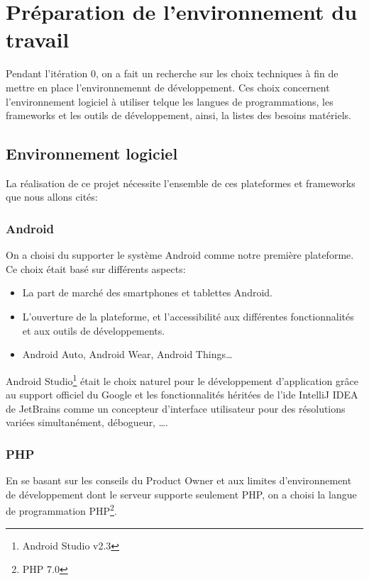 \section{Préparation de l'environnement du travail}

Pendant l'itération 0, on a fait un recherche sur les choix techniques à fin de
mettre en place l'environnemennt de développement. Ces choix concernent
l'environnement logiciel à utiliser telque les langues de programmations, les
frameworks et les outils de développement, ainsi, la listes des besoins
matériels.

\subsection{Environnement logiciel}

La réalisation de ce projet nécessite l'ensemble de ces plateformes et
frameworks que nous allons cités:

\subsubsection{Android}

On a choisi du supporter le système Android comme notre première plateforme. Ce
choix était basé sur différents aspects:

\begin{itemize}
    \item La part de marché des smartphones et tablettes Android.
    \item L'ouverture de la plateforme, et l'accessibilité aux différentes
        fonctionnalités et aux outils de développements.
    \item Android Auto, Android Wear, Android Things\ldots
\end{itemize}

Android Studio\footnote{Android Studio v2.3} était le choix naturel pour le
développement d'application grâce au support officiel du Google et les
fonctionnalités héritées de l'ide IntelliJ IDEA de JetBrains comme un
concepteur d'interface utilisateur pour des résolutions variées simultanément,
débogueur, \ldots.

\subsubsection{PHP}
En se basant sur les conseils du Product Owner et aux limites d'environnement
de développement dont le serveur supporte seulement PHP, on a choisi la langue
de programmation PHP\footnote{PHP 7.0}.

